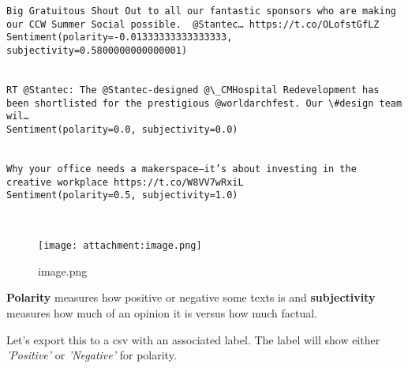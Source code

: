 \documentclass[11pt]{article}
\makeatletter
\def\maxwidth{\ifdim\Gin@nat@width>\linewidth\linewidth
    \else\Gin@nat@width\fi}
\let\Oldincludegraphics\includegraphics
\renewcommand{\includegraphics}[1]{\Oldincludegraphics[width=.8\maxwidth]{#1}}
\makeatother
\begin{document}
\begin{Verbatim}[commandchars=\\\{\}]
Big Gratuitous Shout Out to all our fantastic sponsors who are making our CCW Summer Social possible.  @Stantec… https://t.co/OLofstGfLZ
Sentiment(polarity=-0.01333333333333333, subjectivity=0.5800000000000001)


RT @Stantec: The @Stantec-designed @\_CMHospital Redevelopment has been shortlisted for the prestigious @worldarchfest. Our \#design team wil…
Sentiment(polarity=0.0, subjectivity=0.0)


Why your office needs a makerspace—it’s about investing in the creative workplace https://t.co/W8VV7wRxiL
Sentiment(polarity=0.5, subjectivity=1.0)



    \end{Verbatim}

    \begin{figure}
\centering
\texttt{[image: attachment:image.png]}
\caption{image.png}
\end{figure}

    \textbf{Polarity} measures how positive or negative some texts is and
\textbf{subjectivity} measures how much of an opinion it is versus how
much factual.

    Let's export this to a csv with an associated label. The label will show
either \emph{'Positive'} or \emph{'Negative'} for polarity.
\end{document}
